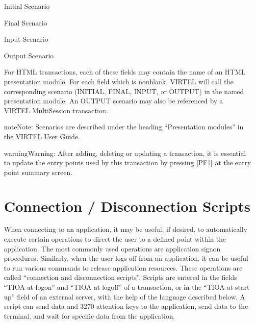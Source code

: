 \documentclass[letterpaper,10pt,english]{sphinxmanual}
\begin{document}
\sphinxAtStartPar
Initial Scenario

\sphinxAtStartPar
Final Scenario

\sphinxAtStartPar
Input Scenario

\sphinxAtStartPar
Output Scenario

\sphinxAtStartPar
For HTML transactions, each of these fields may contain the name of an HTML presentation module. For each field which is non\sphinxhyphen{}blank, VIRTEL will call the corresponding scenario (INITIAL, FINAL, INPUT, or OUTPUT) in the named presentation module. An OUTPUT scenario may also be referenced by a VIRTEL Multi\sphinxhyphen{}Session transaction.

\begin{sphinxadmonition}{note}{Note:}
\sphinxAtStartPar
Scenarios are described under the heading “Presentation modules” in the VIRTEL User Guide.
\end{sphinxadmonition}

\begin{sphinxadmonition}{warning}{Warning:}
\sphinxAtStartPar
After adding, deleting or updating a transaction, it is essential to update the entry points used by this transaction by pressing {[}PF1{]} at the entry point summary screen.
\end{sphinxadmonition}

\ignorespaces 

\chapter{Connection / Disconnection Scripts}
\label{\detokenize{connectivity_guide:connection-disconnection-scripts}}\label{\detokenize{connectivity_guide:index-116}}
\sphinxAtStartPar
When connecting to an application, it may be useful, if desired, to automatically execute certain operations to direct the user to a defined point within the application. The most commonly used operations are application signon procedures. Similarly, when the user logs off from an application, it can be useful to run various commands to release application resources. These operations are called “connection and disconnection scripts”. Scripts are entered in the fields “TIOA at logon” and “TIOA at logoff” of a transaction, or in the “TIOA at start up” field of an external server, with the help of the language described below. A script can send data and 3270 attention keys to the application, send data to the terminal, and wait for specific data from the application.
\end{document}
